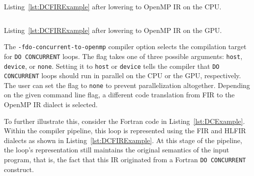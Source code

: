 \documentclass[acmtog,natbib=false]{acmart}
\newcommand{\code}[1]{\texttt{#1}\xspace}
\begin{document}
\begin{listing}[t]
\inputminted{MLIR-lexer.py:MlirLexer -x}{code/dc_omp.mlir}
\caption{Listing~\ref{lst:DCFIRExample} after lowering to OpenMP \ac{IR} on the CPU.}
\label{lst:DCOMPExample}
\end{listing}

\begin{listing}[t]
\inputminted{MLIR-lexer.py:MlirLexer -x}{code/dc_omp_device.mlir}
\caption{Listing~\ref{lst:DCFIRExample} after lowering to OpenMP \ac{IR} on the GPU.}
\label{lst:DCOMPDeviceExample}
\end{listing}

The \code{-fdo-concurrent-to-openmp} compiler option selects the compilation target for \code{DO CONCURRENT} loops.
The flag takes one of three possible arguments: \code{host}, \code{device}, or \code{none}.
Setting it to \code{host} or \code{device} tells the compiler that \code{DO CONCURRENT} loops should run in parallel on the CPU or the GPU, respectively.
The user can set the flag to \code{none} to prevent parallelization altogether.
Depending on the given command line flag, a different code translation from \ac{FIR} to the OpenMP \ac{IR} dialect is selected.


To further illustrate this, consider the Fortran code in Listing~\ref{lst:DCExample}.
Within the compiler pipeline, this loop is represented using the \ac{FIR} and \ac{HLFIR} dialects as shown in Listing~\ref{lst:DCFIRExample}.
At this stage of the pipeline, the loop's representation still maintains the original semantics of the input program, that is, the fact that this IR originated from a Fortran \code{DO CONCURRENT} construct.
\end{document}
